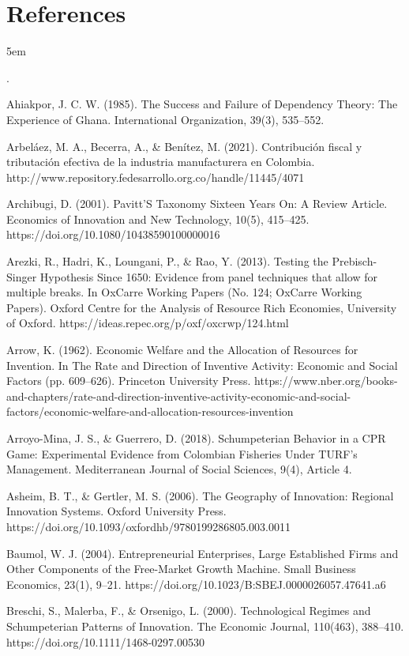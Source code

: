 \documentclass[12pt,a4paper]{article}
\begin{document}
\section*{References}
\emergencystretch 5em
\raggedright
{\setlength{\parindent}{-1.7em}
	\-\footnotesize.
	\normalsize

Ahiakpor, J. C. W. (1985). The Success and Failure of Dependency Theory: The Experience of Ghana. International Organization, 39(3), 535–552.

Arbeláez, M. A., Becerra, A., \& Benítez, M. (2021). Contribución fiscal y tributación efectiva de la industria manufacturera en Colombia. http://www.repository.fedesarrollo.org.co/handle/11445/4071

Archibugi, D. (2001). Pavitt’S Taxonomy Sixteen Years On: A Review Article. Economics of Innovation and New Technology, 10(5), 415–425. https://doi.org/10.1080/10438590100000016

Arezki, R., Hadri, K., Loungani, P., \& Rao, Y. (2013). Testing the Prebisch-Singer Hypothesis Since 1650: Evidence from panel techniques that allow for multiple breaks. In OxCarre Working Papers (No. 124; OxCarre Working Papers). Oxford Centre for the Analysis of Resource Rich Economies, University of Oxford. https://ideas.repec.org/p/oxf/oxcrwp/124.html

Arrow, K. (1962). Economic Welfare and the Allocation of Resources for Invention. In The Rate and Direction of Inventive Activity: Economic and Social Factors (pp. 609–626). Princeton University Press. https://www.nber.org/books-and-chapters/rate-and-direction-inventive-activity-economic-and-social-factors/economic-welfare-and-allocation-resources-invention

Arroyo-Mina, J. S., \& Guerrero, D. (2018). Schumpeterian Behavior in a CPR Game: Experimental Evidence from Colombian Fisheries Under TURF’s Management. Mediterranean Journal of Social Sciences, 9(4), Article 4.

Asheim, B. T., \& Gertler, M. S. (2006). The Geography of Innovation: Regional Innovation Systems. Oxford University Press. https://doi.org/10.1093/oxfordhb/9780199286805.003.0011

Baumol, W. J. (2004). Entrepreneurial Enterprises, Large Established Firms and Other Components of the Free-Market Growth Machine. Small Business Economics, 23(1), 9–21. https://doi.org/10.1023/B:SBEJ.0000026057.47641.a6

Breschi, S., Malerba, F., \& Orsenigo, L. (2000). Technological Regimes and Schumpeterian Patterns of Innovation. The Economic Journal, 110(463), 388–410. https://doi.org/10.1111/1468-0297.00530

}
\end{document}
